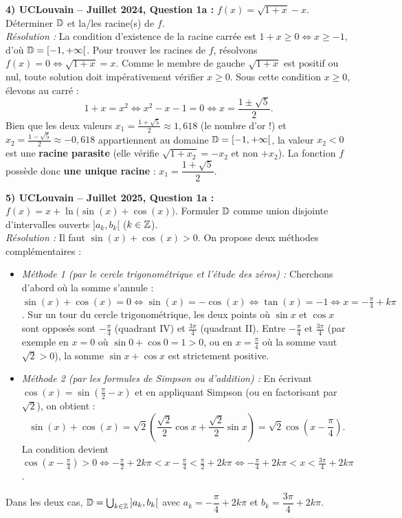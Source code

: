 \begin{exemple}
\medskip
\textbf{4) UCLouvain -- Juillet 2024, Question 1a :} $f(x) = \sqrt{1+x} - x$. Déterminer $\mathbb{D}$ et la/les racine(s) de $f$.\\
\emph{Résolution :} La condition d'existence de la racine carrée est $1 + x \ge 0 \iff x \ge -1$, d'où $\mathbb{D} = [-1, +\infty[$.
Pour trouver les racines de $f$, résolvons $f(x) = 0 \iff \sqrt{1+x} = x$. Comme le membre de gauche $\sqrt{1+x}$ est positif ou nul, toute solution doit impérativement vérifier $x \ge 0$. Sous cette condition $x \ge 0$, élevons au carré :
\[
    1 + x = x^2 \iff x^2 - x - 1 = 0 \iff x = \frac{1 \pm \sqrt{5}}{2}.
\]
Bien que les deux valeurs $x_1 = \frac{1+\sqrt{5}}{2} \approx 1,618$ (le nombre d'or !) et $x_2 = \frac{1-\sqrt{5}}{2} \approx -0,618$ appartiennent au domaine $\mathbb{D} = [-1, +\infty[$, la valeur $x_2 < 0$ est une \textbf{racine parasite} (elle vérifie $\sqrt{1+x_2} = -x_2$ et non $+x_2$). La fonction $f$ possède donc \textbf{une unique racine} : $x_1 = \dfrac{1+\sqrt{5}}{2}$.

\medskip
\textbf{5) UCLouvain -- Juillet 2025, Question 1a :} $f(x) = x + \ln\bigl(\sin(x) + \cos(x)\bigr)$. Formuler $\mathbb{D}$ comme union disjointe d'intervalles ouverts $]a_k, b_k[$ ($k \in \mathbb{Z}$).\\
\emph{Résolution :} Il faut $\sin(x) + \cos(x) > 0$. On propose deux méthodes complémentaires :
\begin{itemize}
    \item \emph{Méthode 1 (par le cercle trigonométrique et l'étude des zéros) :} Cherchons d'abord où la somme s'annule : $\sin(x) + \cos(x) = 0 \iff \sin(x) = -\cos(x) \iff \tan(x) = -1 \iff x = -\frac{\pi}{4} + k\pi$. Sur un tour du cercle trigonométrique, les deux points où $\sin x$ et $\cos x$ sont opposés sont $-\frac{\pi}{4}$ (quadrant IV) et $\frac{3\pi}{4}$ (quadrant II). Entre $-\frac{\pi}{4}$ et $\frac{3\pi}{4}$ (par exemple en $x = 0$ où $\sin 0 + \cos 0 = 1 > 0$, ou en $x = \frac{\pi}{4}$ où la somme vaut $\sqrt{2} > 0$), la somme $\sin x + \cos x$ est strictement positive.
    \item \emph{Méthode 2 (par les formules de Simpson ou d'addition) :} En écrivant $\cos(x) = \sin\left(\frac{\pi}{2}-x\right)$ et en appliquant Simpson (ou en factorisant par $\sqrt{2}$), on obtient :
    \[
        \sin(x) + \cos(x) = \sqrt{2}\left(\frac{\sqrt{2}}{2}\cos x + \frac{\sqrt{2}}{2}\sin x\right) = \sqrt{2}\cos\left(x - \frac{\pi}{4}\right).
    \]
    La condition devient $\cos\left(x - \frac{\pi}{4}\right) > 0 \iff -\frac{\pi}{2} + 2k\pi < x - \frac{\pi}{4} < \frac{\pi}{2} + 2k\pi \iff -\frac{\pi}{4} + 2k\pi < x < \frac{3\pi}{4} + 2k\pi$.
\end{itemize}
Dans les deux cas, $\mathbb{D} = \bigcup_{k\in\mathbb{Z}} \,]a_k, b_k[$ avec $\boxed{a_k = -\dfrac{\pi}{4} + 2k\pi}$ et $\boxed{b_k = \dfrac{3\pi}{4} + 2k\pi}$.
\end{exemple}

